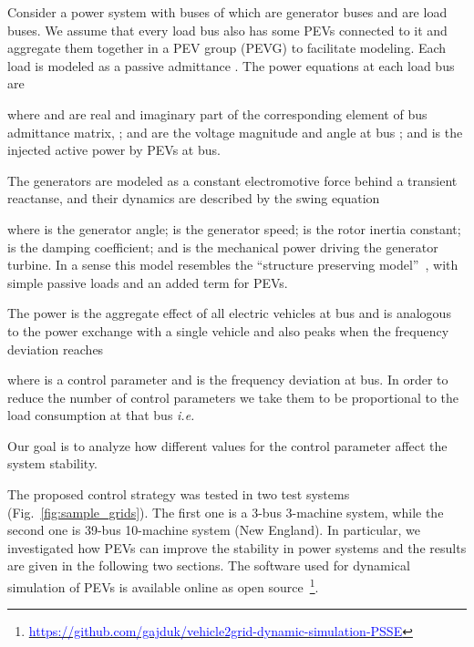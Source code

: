 \documentclass[final,12pt]{elsarticle}
\begin{document}
Consider a power system with  buses of which  are generator buses and 
are load buses. We assume that every load bus also has some PEVs connected to it
and aggregate them together in a PEV group (PEVG) to facilitate modeling.
Each load is modeled as a passive admittance
. The power equations at each load bus are

where  and  are real and
imaginary part of the corresponding element of bus admittance matrix,
;  and  are the
voltage magnitude and angle at  bus ; and  is the injected 
active power by PEVs at  bus.

The generators are modeled as a constant electromotive force behind a transient
reactanse, and their dynamics are described by the swing equation



\noindent where  is the generator angle;  is the generator speed;  is the rotor inertia constant;  is the damping coefficient; and  is the mechanical power driving the generator turbine. In a sense this model resembles the ``structure preserving model''~\cite{van1985structure}, with simple passive loads and an added term for PEVs.

The power  is the aggregate effect of all electric vehicles at  bus and is analogous to the power exchange with a single vehicle and also peaks when the frequency deviation reaches 



\noindent where  is a control parameter and  is the frequency deviation at  bus. 
In order to reduce the number of control parameters we take them to be
proportional to the load consumption at that bus \textit{i.e.} 

Our goal is to analyze how different values for the control parameter  affect the system stability.















The proposed control strategy was tested in two test systems
(Fig.~\ref{fig:sample_grids}). The first one is a 3-bus 3-machine system, while
the second one is 39-bus 10-machine system (New England). In particular, we
investigated how PEVs can improve the stability in power systems and the results
are given in the following two sections. 
The software used for dynamical simulation of PEVs is available online as open source~\footnote{\href{https://github.com/gajduk/vehicle2grid-dynamic-simulation-PSSE}{\textcolor{blue}{https://github.com/gajduk/vehicle2grid-dynamic-simulation-PSSE}}}.
\end{document}
